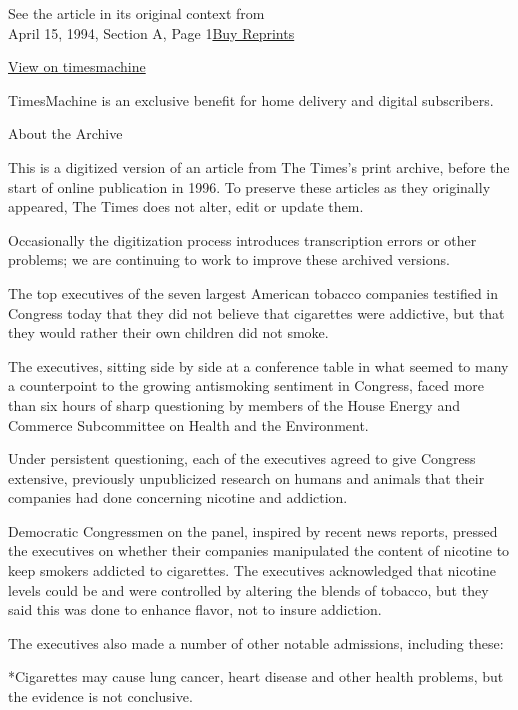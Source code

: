 See the article in its original context from\\
April 15, 1994, Section A, Page
1\href{https://store.nytimes3xbfgragh.onion/collections/new-york-times-page-reprints?utm_source=nytimes\&utm_medium=article-page\&utm_campaign=reprints}{Buy
Reprints}

\href{http://timesmachine.nytimes3xbfgragh.onion/timesmachine/1994/04/15/784079.html}{View
on timesmachine}

TimesMachine is an exclusive benefit for home delivery and digital
subscribers.

About the Archive

This is a digitized version of an article from The Times's print
archive, before the start of online publication in 1996. To preserve
these articles as they originally appeared, The Times does not alter,
edit or update them.

Occasionally the digitization process introduces transcription errors or
other problems; we are continuing to work to improve these archived
versions.

The top executives of the seven largest American tobacco companies
testified in Congress today that they did not believe that cigarettes
were addictive, but that they would rather their own children did not
smoke.

The executives, sitting side by side at a conference table in what
seemed to many a counterpoint to the growing antismoking sentiment in
Congress, faced more than six hours of sharp questioning by members of
the House Energy and Commerce Subcommittee on Health and the
Environment.

Under persistent questioning, each of the executives agreed to give
Congress extensive, previously unpublicized research on humans and
animals that their companies had done concerning nicotine and addiction.

Democratic Congressmen on the panel, inspired by recent news reports,
pressed the executives on whether their companies manipulated the
content of nicotine to keep smokers addicted to cigarettes. The
executives acknowledged that nicotine levels could be and were
controlled by altering the blends of tobacco, but they said this was
done to enhance flavor, not to insure addiction.

The executives also made a number of other notable admissions, including
these:

*Cigarettes may cause lung cancer, heart disease and other health
problems, but the evidence is not conclusive.

